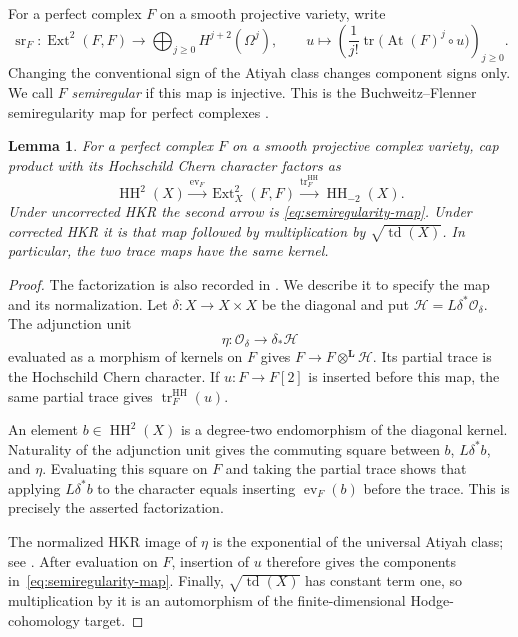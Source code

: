\documentclass[11pt]{article}
\numberwithin{equation}{section}
\newtheorem{lemma}[theorem]{Lemma}
\theoremstyle{definition}
\theoremstyle{remark}
\begin{document}
For a perfect complex $F$ on a smooth projective variety, write
\begin{equation}\label{eq:semiregularity-map}
 \operatorname{sr}_F:\operatorname{Ext}^2(F,F)\longrightarrow
       \bigoplus_{j\ge0}H^{j+2}(\Omega^j),\qquad
 u\longmapsto
 \left(\frac{1}{j!}\operatorname{tr}
       \bigl(\operatorname{At}(F)^j\circ u\bigr)\right)_{j\ge0}.
\end{equation}
Changing the conventional sign of the Atiyah class changes component
signs only. We call $F$ \emph{semiregular} if this map is injective.
This is the Buchweitz--Flenner semiregularity map for perfect complexes
\cite{Deformation:BF2003}.

\begin{lemma}\label{lem:cap-trace}
For a perfect complex $F$ on a smooth projective complex variety, cap
product with its Hochschild Chern character factors as
\[
 \operatorname{HH}^2(X)\xrightarrow{\operatorname{ev}_F}\operatorname{Ext}^2_X(F,F)
      \xrightarrow{\operatorname{tr}^{\operatorname{HH}}_F}\operatorname{HH}_{-2}(X).
\]
Under uncorrected HKR the second arrow is
\eqref{eq:semiregularity-map}. Under corrected HKR it is that map
followed by multiplication by $\sqrt{\operatorname{td}(X)}$. In particular, the
two trace maps have the same kernel.
\end{lemma}

\begin{proof}
The factorization is also recorded in
\cite[Corollary~6.3.2 and Theorem~6.4.2]{Deformation:BF2008}.
We describe it to specify the map and its normalization.
Let $\delta:X\to X\times X$ be the diagonal and put
$\mathcal H=L\delta^*\mathcal O_\delta$. The adjunction unit
\[
 \eta:\mathcal O_\delta\longrightarrow\delta_*\mathcal H
\]
evaluated as a morphism of kernels on $F$ gives
$F\to F\otimes^{\mathbf L}\mathcal H$. Its partial trace is the
Hochschild Chern character. If $u:F\to F[2]$ is inserted before this
map, the same partial trace gives
$\operatorname{tr}^{\operatorname{HH}}_F(u)$.

An element $b\in\operatorname{HH}^2(X)$ is a degree-two endomorphism of the
diagonal kernel. Naturality of the adjunction unit gives the
commuting square between $b$, $L\delta^*b$, and $\eta$. Evaluating
this square on $F$ and taking the partial trace shows that applying
$L\delta^*b$ to the character equals inserting
$\operatorname{ev}_F(b)$ before the trace. This is precisely the
asserted factorization.

The normalized HKR image of $\eta$ is the exponential of the
universal Atiyah class; see
\cite[Proposition~4.4 and Theorem~4.5]{Deformation:Caldararu}.
After evaluation on $F$, insertion of $u$ therefore gives the
components in~\eqref{eq:semiregularity-map}. Finally,
$\sqrt{\operatorname{td}(X)}$ has constant term one, so multiplication by it is
an automorphism of the finite-dimensional Hodge-cohomology target.
\end{proof}
\end{document}
